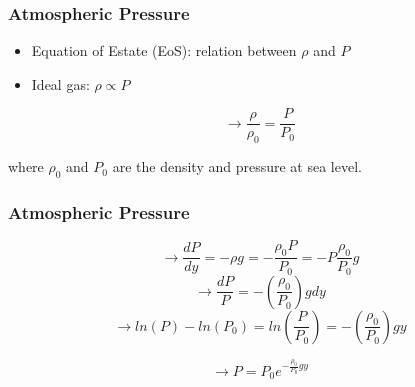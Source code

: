 \documentclass[]{beamer}
\begin{document}
\begin{frame}
\frametitle{Atmospheric Pressure}

\begin{itemize}
  \item Equation of Estate (EoS): relation between $\rho$ and $P$
  \pause
  \vspace{3mm}
  \pause
  \item Ideal gas:  $ \boxed{\rho \propto P}$
\end{itemize}

\pause

\begin{equation*}
  \rightarrow \frac{\rho}{\rho_0}=\frac{P}{P_0}
\end{equation*}
\vspace{3mm}

\pause

 where $\rho_0$ and $P_0$ are the density and pressure at sea level.



  \end{frame}
\begin{frame}
  \frametitle{Atmospheric Pressure}
  
  \begin{equation*}
    \rightarrow  \frac{dP}{dy}=-\rho g=-\frac{\rho_0P}{P_0}=-P\frac{\rho_0}{P_0}g
  \end{equation*}
  \pause
  \begin{equation*}
  \rightarrow \frac{dP}{P}=-(\frac{\rho_0}{P_0})gdy
  \end{equation*}
  \pause
  \begin{equation*}
  \rightarrow ln(P)-ln(P_0)= ln( \frac{P}{P_0})=-(\frac{\rho_0}{P_0})gy
  \end{equation*}
  
  \pause
  \begin{equation}
  \rightarrow \boxed{P=P_0 e^{-\frac{\rho_0}{P_0}gy}}
  \end{equation}
  
    \end{frame}
\end{document}

